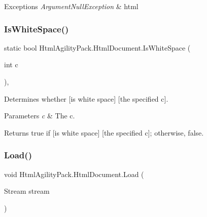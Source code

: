 \begin{DoxyExceptions}{Exceptions}
{\em Argument\+Null\+Exception} & html\\
\hline
\end{DoxyExceptions}
\mbox{\label{class_html_agility_pack_1_1_html_document_a133cce0bd1abffb920568b6412736f89}} 
\subsubsection{\texorpdfstring{Is\+White\+Space()}{IsWhiteSpace()}}
{\footnotesize\ttfamily static bool Html\+Agility\+Pack.\+Html\+Document.\+Is\+White\+Space (\begin{DoxyParamCaption}\item[{int}]{c }\end{DoxyParamCaption})\hspace{0.3cm}{\ttfamily [inline]}, {\ttfamily [static]}}



Determines whether \mbox{[}is white space\mbox{]} \mbox{[}the specified c\mbox{]}. 


\begin{DoxyParams}{Parameters}
{\em c} & The c.\\
\hline
\end{DoxyParams}
\begin{DoxyReturn}{Returns}
{\ttfamily true} if \mbox{[}is white space\mbox{]} \mbox{[}the specified c\mbox{]}; otherwise, {\ttfamily false}.
\end{DoxyReturn}
\mbox{\label{class_html_agility_pack_1_1_html_document_ad242d26abadad4ed8f73e4391333949d}} 
\subsubsection{\texorpdfstring{Load()}{Load()}\hspace{0.1cm}{\footnotesize\ttfamily [1/11]}}
{\footnotesize\ttfamily void Html\+Agility\+Pack.\+Html\+Document.\+Load (\begin{DoxyParamCaption}\item[{Stream}]{stream }\end{DoxyParamCaption})\hspace{0.3cm}{\ttfamily [inline]}}



